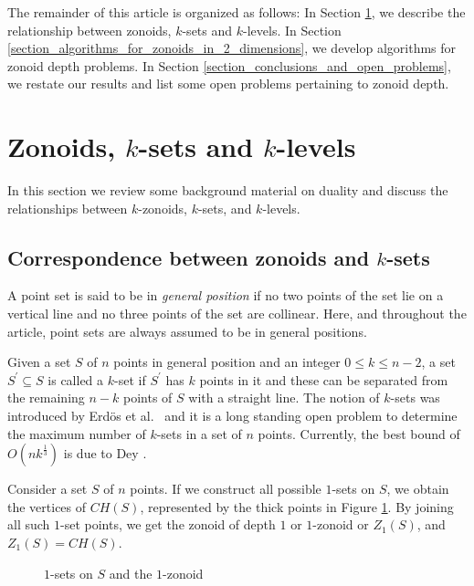 \documentclass[charterfonts,lotsofwhite]{patmorin}
\begin{document}
The remainder of this article is organized as follows: In Section
\ref{section_zonoids_ksets_and_klevels}, we describe the relationship
between zonoids, $k$-sets and $k$-levels.  In Section
\ref{section_algorithms_for_zonoids_in_2_dimensions}, we develop
algorithms for zonoid depth problems.  In Section
\ref{section_conclusions_and_open_problems}, we restate our results
and list some open problems pertaining to zonoid depth.


\section{Zonoids, $k$-sets and $k$-levels}
\label{section_zonoids_ksets_and_klevels}

In this section we review some background material on duality and
discuss the relationships between $k$-zonoids, $k$-sets, and
$k$-levels.

\subsection{Correspondence between zonoids and $k$-sets}\label{subsection_correspondence_between_zonoids_and_ksets}

A point set is said to be in \emph{general position} if no two points of the set lie on a vertical line and no three points of the set are collinear. Here, and throughout the article, point sets are always assumed to be in general positions.

Given a set $S$ of $n$ points in general position and an integer $0 \le k \le n-2$, a set $S^{\prime} \subseteq S$ is called a $k$-set if $S^{\prime}$ has $k$ points in it and these can be separated from the remaining $n-k$ points of $S$ with a straight line. The notion of $k$-sets was introduced by Erd\"{o}s et al.\ \cite{dissection_graphs_of_planar_point_sets} and it is a long standing open problem to determine the maximum number of $k$-sets in a set of $n$ points. Currently, the best bound of $O(nk^{\frac{1}{3}})$ is due to Dey \cite{improved_bounds_on_planar_ksets_and_klevels}.

Consider a set $S$ of $n$ points. If we construct all possible $1$-sets on $S$, we obtain the vertices of $CH(S)$, represented by the thick points in Figure \ref{fig_1_set}. By joining all such $1$-set points, we get the zonoid of depth $1$ or $1$-zonoid or $Z_1(S)$, and $Z_1(S) = CH(S)$.

\begin{figure}[h!]
 \begin{center}
   \caption{\label{fig_1_set}$1$-sets on $S$ and the $1$-zonoid}
 \end{center}
\end{figure}
\end{document}
